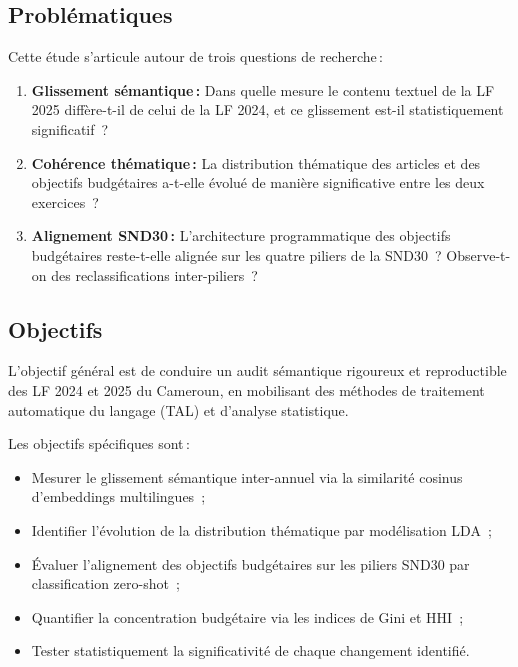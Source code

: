 \documentclass[12pt, a4paper]{article}
\begin{document}
\subsection{Problématiques}

Cette étude s'articule autour de trois questions de recherche\,:

\begin{enumerate}[label=\textbf{Q\arabic*.}, leftmargin=2cm]
  \item \textbf{Glissement sémantique\,:} Dans quelle mesure le contenu textuel de la LF 2025 
  diffère-t-il de celui de la LF 2024, et ce glissement est-il statistiquement significatif~?
  
  \item \textbf{Cohérence thématique\,:} La distribution thématique des articles et des objectifs 
  budgétaires a-t-elle évolué de manière significative entre les deux exercices~?
  
  \item \textbf{Alignement SND30\,:} L'architecture programmatique des objectifs budgétaires reste-t-elle 
  alignée sur les quatre piliers de la SND30~? Observe-t-on des reclassifications inter-piliers~?
\end{enumerate}

\subsection{Objectifs}

L'objectif général est de conduire un audit sémantique rigoureux et reproductible des LF 2024 et 2025 
du Cameroun, en mobilisant des méthodes de traitement automatique du langage (TAL) et d'analyse statistique.

Les objectifs spécifiques sont\,:
\begin{itemize}[noitemsep]
  \item Mesurer le glissement sémantique inter-annuel via la similarité cosinus d'embeddings multilingues~;
  \item Identifier l'évolution de la distribution thématique par modélisation LDA~;
  \item Évaluer l'alignement des objectifs budgétaires sur les piliers SND30 par classification zero-shot~;
  \item Quantifier la concentration budgétaire via les indices de Gini et HHI~;
  \item Tester statistiquement la significativité de chaque changement identifié.
\end{itemize}
\end{document}
